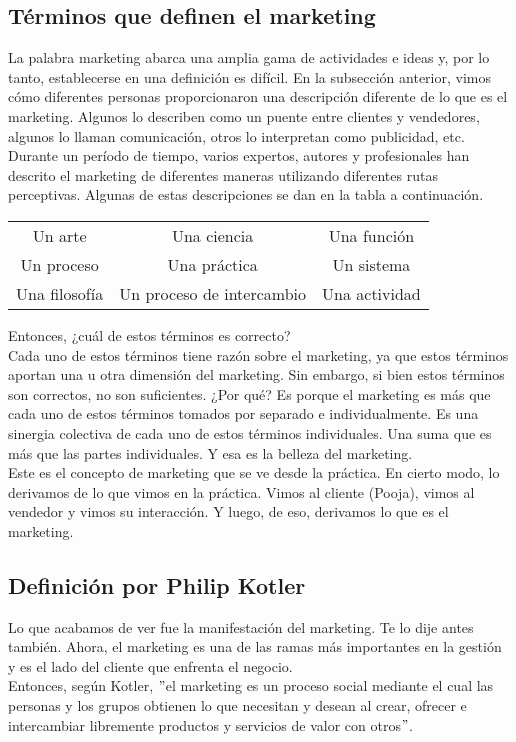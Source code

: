 \documentclass[10pt]{book}
\begin{document}
\subsection{Términos que definen el marketing}
La palabra marketing abarca una amplia gama de actividades e ideas y, por lo tanto, establecerse en una definición es difícil. En la subsección anterior, vimos cómo diferentes personas proporcionaron una descripción diferente de lo que es el marketing. Algunos lo describen como un puente entre clientes y vendedores, algunos lo llaman comunicación, otros lo interpretan como publicidad, etc.\\
Durante un período de tiempo, varios expertos, autores y profesionales han descrito el marketing de diferentes maneras utilizando diferentes rutas perceptivas. Algunas de estas descripciones se dan en la tabla a continuación.\\
\begin{center}
\begin{tabular}{c c c}
Un arte&Una ciencia&Una función\\
Un proceso&Una práctica&Un sistema\\
Una filosofía&Un proceso de intercambio&Una actividad\\
\end{tabular}
\end{center}
Entonces, ¿cuál de estos términos es correcto? \\
Cada uno de estos términos tiene razón sobre el marketing, ya que estos términos aportan una u otra dimensión del marketing. Sin embargo, si bien estos términos son correctos, no son suficientes. ¿Por qué? Es porque el marketing es más que cada uno de estos términos tomados por separado e individualmente. Es una sinergia colectiva de cada uno de estos términos individuales. Una suma que es más que las partes individuales. Y esa es la belleza del marketing.\\
Este es el concepto de marketing que se ve desde la práctica. En cierto modo, lo derivamos de lo que vimos en la práctica. Vimos al cliente (Pooja), vimos al vendedor y vimos su interacción. Y luego, de eso, derivamos lo que es el marketing.
\subsection{Definición por Philip Kotler} 
Lo que acabamos de ver fue la manifestación del marketing. Te lo dije antes también. Ahora, el marketing es una de las ramas más importantes en la gestión y es el lado del cliente que enfrenta el negocio.\\
Entonces, según Kotler, $"$el marketing es un proceso social mediante el cual las personas y los grupos obtienen lo que necesitan y desean al crear, ofrecer e intercambiar libremente productos y servicios de valor con otros$"$. 
\end{document}
